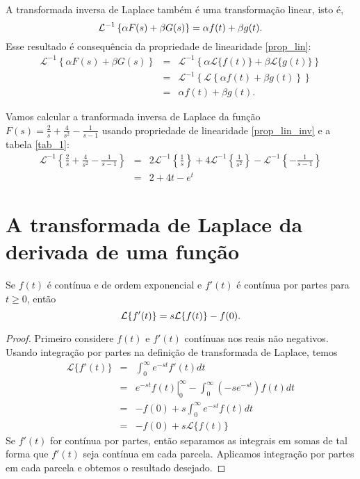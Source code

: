 \begin{obs}A transformada inversa de Laplace também é uma transformação linear, isto é,
\begin{equation}{\label{prop_lin_inv}}
\mathcal{L }^{-1}\left\{\alpha F(s)+\beta G(s)\right\}=\alpha f(t)+\beta g(t).
\end{equation}
Esse resultado é consequência da propriedade de linearidade \ref{prop_lin}:
\begin{eqnarray*}
\mathcal{L }^{-1}\left\{\alpha F(s)+\beta G(s)\right\}&=&\mathcal{L }^{-1}\left\{\alpha \mathcal{L}\{f(t)\}+\beta \mathcal{L}\{g(t)\}\right\}\\
&=&\mathcal{L }^{-1}\left\{\mathcal{L}\left\{\alpha f(t)+\beta g(t)\right\}\right\}\\
&=&\alpha  f(t)+\beta g(t).
\end{eqnarray*}
\end{obs}

\begin{ex}Vamos calcular a tranformada inversa de Laplace da função $F(s)=\frac{2}{s}+\frac{4}{s^2}-\frac{1}{s-1}$ usando propriedade de linearidade \ref{prop_lin_inv} e a tabela \ref{tab_1}:
\begin{eqnarray*}
\mathcal{L }^{-1}\left\{\frac{2}{s}+\frac{4}{s^2}-\frac{1}{s-1}\right\}&=& 2\mathcal{L }^{-1}\left\{\frac{1}{s}\right\}+4\mathcal{L }^{-1}\left\{\frac{1}{s^2}\right\}-\mathcal{L }^{-1}\left\{-\frac{1}{s-1}\right\}\\
&=&2+4t-e^t
\end{eqnarray*} 
\end{ex}

\section{A transformada de Laplace da derivada de uma função}
\begin{propr}{\label{prop_der}}Se $f(t)$ é contínua e de ordem exponencial e $f'(t)$ é contínua por partes para $t\geq 0$, então
\begin{equation}{\label{prop_der_1}}
\mathcal{L }\{f'(t)\}=s \mathcal{L }\{ f(t)\}-f(0).
\end{equation}
\end{propr}
\begin{proof}
Primeiro considere $f(t)$ e $f'(t)$ contínuas nos reais não negativos. Usando integração por partes na definição de transformada de Laplace, temos 
\begin{eqnarray*}
 \mathcal{L}\{f'(t)\}&=&\int_0^\infty e^{-st} f'(t)dt\\
 &=&\left.e^{-st}f(t)\right|_0^\infty-  \int_0^\infty (-se^{-st}) f(t)dt\\
 &=&-f(0)+  s\int_0^\infty e^{-st}f(t)dt\\
 &=&-f(0)+  s\mathcal{L}\{f(t)\}
 \end{eqnarray*}
Se $f'(t)$ for contínua por partes, então separamos as integrais em somas de tal forma que $f'(t)$ seja contínua em cada parcela. Aplicamos integração por partes em cada parcela e obtemos o resultado desejado.
\end{proof}

